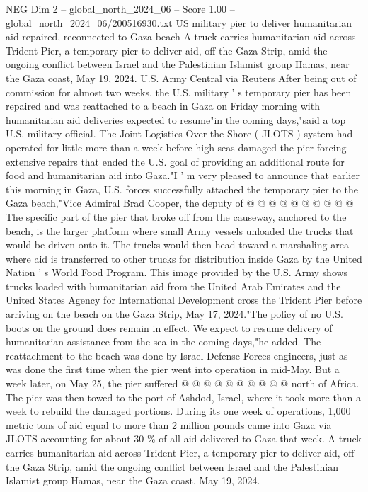 \begin{textsample}{NEG Dim 2 – global\_north\_2024\_06 – Score 1.00 – global\_north\_2024\_06/200516930.txt}  \label{ex:f2_neg_133}
US military pier to deliver humanitarian aid repaired, reconnected to Gaza beach A truck carries humanitarian aid across Trident Pier, a temporary pier to deliver aid, off the Gaza Strip, amid the ongoing conflict between Israel and the Palestinian Islamist group Hamas, near the Gaza coast, May 19, 2024.
U.S.
Army Central via Reuters After being out of commission for almost two weeks, the U.S. military ' s temporary pier has been repaired and was reattached to a beach in Gaza on Friday morning with humanitarian aid deliveries expected to resume"in the coming days,"said a top U.S. military official.
The Joint Logistics Over the Shore ( JLOTS ) system had operated for little more than a week before high seas damaged the pier forcing extensive repairs that ended the U.S. goal of providing an additional route for food and humanitarian aid into Gaza."I ' m very pleased to announce that earlier this morning in Gaza, U.S. forces successfully attached the temporary pier to the Gaza beach,"Vice Admiral Brad Cooper, the deputy of @ @ @ @ @ @ @ @ @ @ The specific part of the pier that broke off from the causeway, anchored to the beach, is the larger platform where small Army vessels unloaded the trucks that would be driven onto it.
The trucks would then head toward a marshaling area where aid is transferred to other trucks for distribution inside Gaza by the United Nation ' s World Food Program.
This image provided by the U.S.
Army shows trucks loaded with humanitarian aid from the United Arab Emirates and the United States Agency for International Development cross the Trident Pier before arriving on the beach on the Gaza Strip, May 17, 2024."The policy of no U.S. boots on the ground does remain in effect.
We expect to resume delivery of humanitarian assistance from the sea in the coming days,"he added.
The reattachment to the beach was done by Israel Defense Forces engineers, just as was done the first time when the pier went into operation in mid-May.
But a week later, on May 25, the pier suffered @ @ @ @ @ @ @ @ @ @ north of Africa.
The pier was then towed to the port of Ashdod, Israel, where it took more than a week to rebuild the damaged portions.
During its one week of operations, 1,000 metric tons of aid equal to more than 2 million pounds came into Gaza via JLOTS accounting for about 30 \% of all aid delivered to Gaza that week.
A truck carries humanitarian aid across Trident Pier, a temporary pier to deliver aid, off the Gaza Strip, amid the ongoing conflict between Israel and the Palestinian Islamist group Hamas, near the Gaza coast, May 19, 2024.

\end{textsample}
